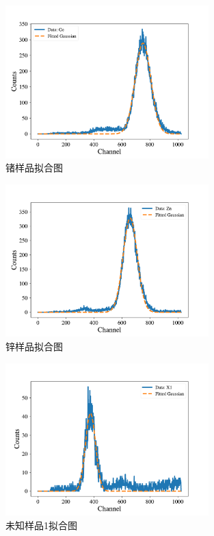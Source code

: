 \documentclass{article}
\begin{document}
    \begin{figure}[htbp]
        \centering
        \includegraphics[width=0.7\textwidth]{../plot/Fitted_Ge.pdf}
        \caption{锗样品拟合图\label{fig:Fitted_Ge}}
    \end{figure}
    \begin{figure}[htbp]
        \centering
        \includegraphics[width=0.7\textwidth]{../plot/Fitted_Zn.pdf}
        \caption{锌样品拟合图\label{fig:Fitted_Zn}}
    \end{figure}
    \begin{figure}[htbp]
        \centering
        \includegraphics[width=0.7\textwidth]{../plot/Fitted_X1.pdf}
        \caption{未知样品1拟合图\label{fig:Fitted_X1}}
    \end{figure}
\end{document}
